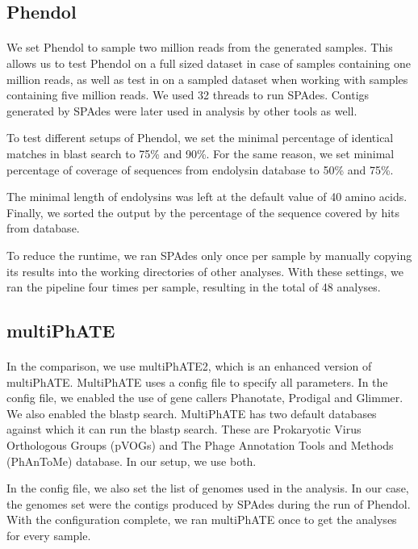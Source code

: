 \subsection{Phendol}
\paragraph*{}
We set Phendol to sample two million reads from the generated samples. This allows us to test Phendol on a full sized dataset in case of samples containing one million reads, as well as test in on a sampled dataset when working with samples containing five million reads. We used 32 threads to run SPAdes. Contigs generated by SPAdes were later used in analysis by other tools as well.

To test different setups of Phendol, we set the minimal percentage of identical matches in blast search to 75\% and 90\%. For the same reason, we set minimal percentage of coverage of sequences from endolysin database to 50\% and 75\%.

The minimal length of endolysins was left at the default value of 40 amino acids. Finally, we sorted the output by the percentage of the sequence covered by hits from database.

To reduce the runtime, we ran SPAdes only once per sample by manually copying its results into the working directories of other analyses. With these settings, we ran the pipeline four times per sample, resulting in the total of 48 analyses.

\subsection{multiPhATE}
\paragraph*{}
In the comparison, we use multiPhATE2, which is an enhanced version of multiPhATE. MultiPhATE uses a config file to specify all parameters. In the config file, we enabled the use of gene callers Phanotate, Prodigal and Glimmer. We also enabled the blastp search. MultiPhATE has two default databases against which it can run the blastp search. These are Prokaryotic Virus Orthologous Groups (pVOGs) \cite{grazziotin2016prokaryotic} and The Phage Annotation Tools and Methods (PhAnToMe) database. In our setup, we use both.

In the config file, we also set the list of genomes used in the analysis. In our case, the genomes set were the contigs produced by SPAdes during the run of Phendol. With the configuration complete, we ran multiPhATE once to get the analyses for every sample.

